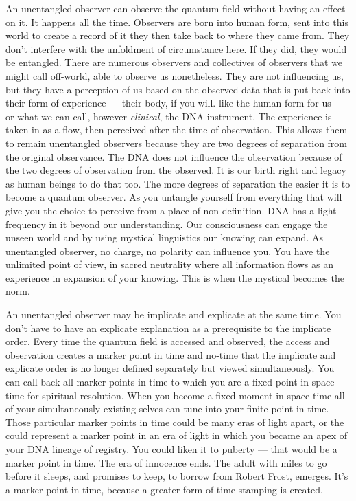 An unentangled observer can observe the quantum field without having an
effect on it. It happens all the time. Observers are born into human
form, sent into this world to create a record of it they then take back
to where they came from. They don't interfere with the unfoldment of
circumstance here. If they did, they would be entangled. There are
numerous observers and collectives of observers that we might call
off-world, able to observe us nonetheless. They are not influencing us,
but they have a perception of us based on the observed data that is put
back into their form of experience --- their body, if you will. like the
human form for us --- or what we can call, however \emph{clinical}, the
DNA instrument. The experience is taken in as a flow, then perceived
after the time of observation. This allows them to remain unentangled
observers because they are two degrees of separation from the original
observance. The DNA does not influence the observation because of the
two degrees of observation from the observed. It is our birth right and
legacy as human beings to do that too. The more degrees of separation
the easier it is to become a quantum observer. As you untangle yourself
from everything that will give you the choice to perceive from a place
of non-definition. DNA has a light frequency in it beyond our
understanding. Our consciousness can engage the unseen world and by
using mystical linguistics our knowing can expand. As unentangled
observer, no charge, no polarity can influence you. You have the
unlimited point of view, in sacred neutrality where all information
flows as an experience in expansion of your knowing. This is when the
mystical becomes the norm.

An unentangled observer may be implicate and explicate at the same time.
You don't have to have an explicate explanation as a prerequisite to the
implicate order. Every time the quantum field is accessed and observed,
the access and observation creates a marker point in time and no-time
that the implicate and explicate order is no longer defined separately
but viewed simultaneously. You can call back all marker points in time
to which you are a fixed point in space-time for spiritual resolution.
When you become a fixed moment in space-time all of your simultaneously
existing selves can tune into your finite point in time. Those
particular marker points in time could be many eras of light apart, or
the could represent a marker point in an era of light in which you
became an apex of your DNA lineage of registry. You could liken it to
puberty --- that would be a marker point in time. The era of innocence
ends. The adult with miles to go before it sleeps, and promises to keep,
to borrow from Robert Frost, emerges. It's a marker point in time,
because a greater form of time stamping is created.


